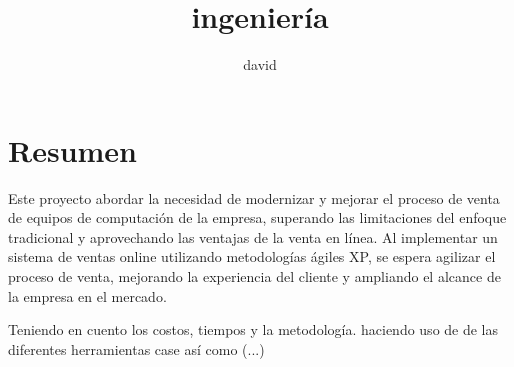 \documentclass[12pt,a4paper]{article}
\title{ingeniería}
\author{david}
\newcommand{\espacio}{\par\vspace{3mm}}
\newcommand{\logoleft}{images/Sistemaslogo.png}
\newcommand{\logoright}{images/Logo_UNAP.png}
\newcommand{\newsection}[1]{\section{\hspace{4mm} #1}}%
\newcommand{\empresa}{Pantera Digital World S.A.C. }
\renewcommand{\thesection}{\Roman{section}}%
\begin{document}

\newpage
\tableofcontents
\newpage

\pagestyle{fancy}
\fancyhf{} %
\renewcommand{\headrulewidth}{3pt}
\renewcommand{\headrule}{\hbox to\headwidth{\color{azul}\leaders\hrule height \headrulewidth\hfill}}



\fancyfoot[R]{\thepage}




\newsection{Resumen}
%
Este proyecto abordar la necesidad de modernizar y mejorar el proceso de venta de equipos de computación de la empresa, superando las limitaciones del enfoque tradicional y aprovechando las ventajas de la venta en línea. Al implementar un sistema de ventas online utilizando metodologías ágiles XP, se espera agilizar el proceso de venta, mejorando la experiencia del cliente y ampliando el alcance de la empresa en el mercado.
\espacio
Teniendo en cuento los costos, tiempos y la metodología. 
haciendo uso de de las diferentes herramientas case así como (...)
 
\end{document}
